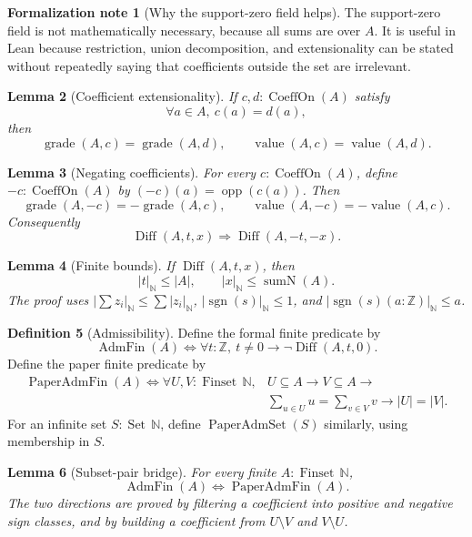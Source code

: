 \documentclass[11pt]{article}
\theoremstyle{definition}
\newtheorem{definition}{Definition}[section]
\newtheorem{formalnote}[definition]{Formalization note}
\theoremstyle{plain}
\newtheorem{lemma}[definition]{Lemma}
\theoremstyle{remark}
\newcommand{\N}{\mathbb{N}}
\newcommand{\Z}{\mathbb{Z}}
\newcommand{\Finset}{\operatorname{Finset}}
\newcommand{\Set}{\operatorname{Set}}
\newcommand{\sgn}{\operatorname{sgn}}
\newcommand{\opp}{\operatorname{opp}}
\newcommand{\nabs}[1]{\left|#1\right|_{\N}}
\newcommand{\card}[1]{\left|#1\right|}
\newcommand{\SumN}{\operatorname{sumN}}
\newcommand{\CoeffOn}{\operatorname{CoeffOn}}
\newcommand{\Grade}{\operatorname{grade}}
\newcommand{\Val}{\operatorname{value}}
\newcommand{\Diff}{\operatorname{Diff}}
\newcommand{\AdmF}{\operatorname{AdmFin}}
\newcommand{\PaperAdmF}{\operatorname{PaperAdmFin}}
\newcommand{\PaperAdmS}{\operatorname{PaperAdmSet}}
\begin{document}
\begin{formalnote}[Why the support-zero field helps]
The support-zero field is not mathematically necessary, because all sums are over \(A\).  It is useful in Lean because restriction, union decomposition, and extensionality can be stated without repeatedly saying that coefficients outside the set are irrelevant.
\end{formalnote}

\begin{lemma}[Coefficient extensionality]\label{lem:v9-coeff-ext}
If \(c,d:\CoeffOn(A)\) satisfy
\[
        \forall a\in A,\ c(a)=d(a),
\]
then
\[
        \Grade(A,c)=\Grade(A,d),
        \qquad
        \Val(A,c)=\Val(A,d).
\]
\end{lemma}

\begin{lemma}[Negating coefficients]\label{lem:v9-coeff-neg}
For every \(c:\CoeffOn(A)\), define \(-c:\CoeffOn(A)\) by \((-c)(a)=\opp(c(a))\).  Then
\[
        \Grade(A,-c)=-\Grade(A,c),
        \qquad
        \Val(A,-c)=-\Val(A,c).
\]
Consequently
\[
        \Diff(A,t,x)\Rightarrow \Diff(A,-t,-x).
\]
\end{lemma}

\begin{lemma}[Finite bounds]\label{lem:v9-diff-bounds}
If \(\Diff(A,t,x)\), then
\[
        \nabs t\le \card A,
        \qquad
        \nabs x\le \SumN(A).
\]
The proof uses \(\nabs{\sum z_i}\le\sum\nabs{z_i}\), \(\nabs{\sgn(s)}\le1\), and \(\nabs{\sgn(s)(a:\Z)}\le a\).
\end{lemma}

\begin{definition}[Admissibility]\label{def:v9-admissibility}
Define the formal finite predicate by
\[
        \AdmF(A)\Longleftrightarrow
        \forall t:\Z,\ t\ne0\to\neg\Diff(A,t,0).
\]
Define the paper finite predicate by
\[
\begin{aligned}
\PaperAdmF(A)\Longleftrightarrow
\forall U,V:\Finset\,\N,
& U\subseteq A\to V\subseteq A\to\\
& \sum_{u\in U}u=\sum_{v\in V}v\to \card U=\card V.
\end{aligned}
\]
For an infinite set \(S:\Set\,\N\), define \(\PaperAdmS(S)\) similarly, using membership in \(S\).
\end{definition}

\begin{lemma}[Subset-pair bridge]\label{lem:v9-subset-bridge}
For every finite \(A:\Finset\,\N\),
\[
        \AdmF(A)\Longleftrightarrow \PaperAdmF(A).
\]
The two directions are proved by filtering a coefficient into positive and negative sign classes, and by building a coefficient from \(U\setminus V\) and \(V\setminus U\).
\end{lemma}
\end{document}
